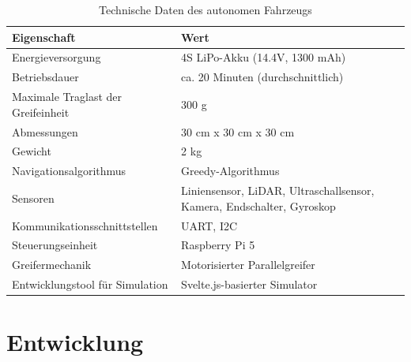 \documentclass[main.tex]{subfiles} %
\begin{document}
\begin{table}[H]
    \centering
    \renewcommand{\arraystretch}{1.5}
    \begin{tabular}{|l|p{7cm}|}
        \hline
        \textbf{Eigenschaft}               & \textbf{Wert}                                                             \\ \hline
        Energieversorgung                  & 4S LiPo-Akku (14.4V, 1300 mAh)                                            \\ \hline
        Betriebsdauer                      & ca. 20 Minuten (durchschnittlich)                                         \\ \hline
        Maximale Traglast der Greifeinheit & 300 g                                                                     \\ \hline %
        Abmessungen                        & 30 cm x 30 cm x 30 cm                                                     \\ \hline
        Gewicht                            & 2 kg                                                                      \\ \hline
        Navigationsalgorithmus             & Greedy-Algorithmus                                                    \\ \hline
        Sensoren                           & Liniensensor, LiDAR, Ultraschallsensor, Kamera, Endschalter, Gyroskop \\ \hline
        Kommunikationsschnittstellen       & UART, I2C                                                                 \\ \hline
        Steuerungseinheit                  & Raspberry Pi 5                                                            \\ \hline %
        Greifermechanik                    & Motorisierter Parallelgreifer                                             \\ \hline
        Entwicklungstool für Simulation    & Svelte.js-basierter Simulator                                             \\ \hline
    \end{tabular}
    \caption{Technische Daten des autonomen Fahrzeugs}
    \label{tab:hardfacts}
\end{table}


\newpage
\section{Entwicklung}


\newpage


\newpage


\newpage
\end{document}
